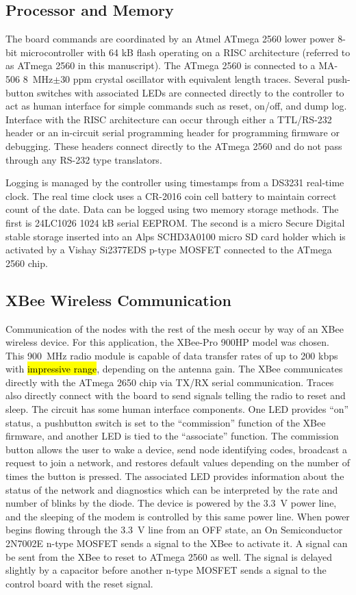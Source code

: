 \documentclass[numbook, envcountsect, envcountsame, envcountreset, runningheads, twocolumn]{svjour3}
\begin{document}
		\subsection{Processor and Memory}
			The board commands are coordinated by an Atmel ATmega 2560 lower power 8-bit microcontroller with 64 kB flash operating on a RISC architecture (referred to as ATmega 2560 in this manuscript).  The ATmega 2560 is connected to a MA-506 \SI{8}{\mega\hertz}$\pm$30 ppm crystal oscillator with equivalent length traces.  Several push-button switches with associated LEDs are connected directly to the controller to act as human interface for simple commands such as reset, on/off, and dump log.  Interface with the RISC architecture can occur through either a TTL/RS-232 header or an in-circuit serial programming header for programming firmware or debugging.  These headers connect directly to the ATmega 2560 and do not pass through any RS-232 type translators.  
			
			Logging is managed by the controller using timestamps from a DS3231 real-time clock.  The real time clock uses a CR-2016 coin cell battery to maintain correct count of the date.  Data can be logged using two memory storage methods.  The first is 24LC1026 1024 kB serial EEPROM.  The second is a micro Secure Digital stable storage inserted into an Alps SCHD3A0100 micro SD card holder which is activated by a Vishay Si2377EDS p-type MOSFET connected to the ATmega 2560 chip.
			
		\subsection{XBee Wireless Communication}
			Communication of the nodes with the rest of the mesh occur by way of an XBee wireless device.  For this application, the XBee-Pro 900HP model was chosen.  This \SI{900}{\mega\hertz} radio module is capable of data transfer rates of up to 200 kbps with \hl{impressive range}, depending on the antenna gain.  The XBee communicates directly with the ATmega 2650 chip via TX/RX serial communication.  Traces also directly connect with the board to send signals telling the radio to reset and sleep.  The circuit has some human interface components.  One LED provides ``on'' status, a pushbutton switch is set to the ``commission'' function of the XBee firmware, and another LED is tied to the ``associate'' function.  The commission button allows the user to wake a device, send node identifying codes, broadcast a request to join a network, and restores default values depending on the number of times the button is pressed.  The associated LED provides information about the status of the network and diagnostics which can be interpreted by the rate and number of blinks by the diode.  The device is powered by the \SI{3.3}{\volt} power line, and the sleeping of the modem is controlled by this same power line.  When power begins flowing through the \SI{3.3}{\volt} line from an OFF state, an On Semiconductor 2N7002E n-type MOSFET sends a signal to the XBee to activate it.  A signal can be sent from the XBee to reset to ATmega 2560 as well. The signal is delayed slightly by a capacitor before another n-type MOSFET sends a signal to the control board with the reset signal.
			
\end{document}
